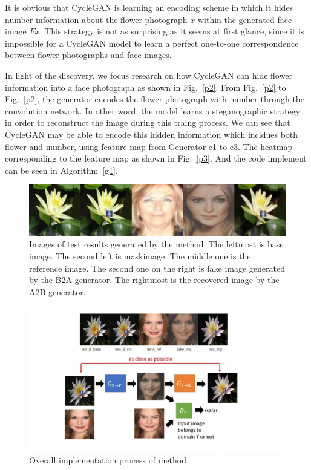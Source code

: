 \documentclass[a4paper]{article}
\begin{document}
	It is obvious that CycleGAN is learning an encoding scheme in which it hides number information about the flower photograph $x$ within the generated face image $F x$. This strategy is not as surprising as it seems at first glance, since it is impossible for a CycleGAN model to learn a perfect one-to-one correspondence between flower photographs and face images.
	
	In light of the discovery, we focus research on how CycleGAN can hide flower information into a face photograph as shown in Fig.~\ref{p2}. From Fig.~\ref{p2} to Fig.~\ref{p2}, the generator encodes the flower photograph with number through the convolution network. In other word, the model learns a steganographic strategy in order to reconstruct the image during this traing process. We can see that CycleGAN may be able to encode this hidden information which incldues both flower and number, using feature map from Generator c1 to c3. The heatmap corresponding to the feature map as shown in Fig.~\ref{p3}. And the code implement can be seen in Algorithm~\ref{g1}.
	\begin{figure}
		\begin{center}
			\includegraphics[scale=0.3]{figures/image_00284/BtoA_image_00284.jpg}
		\end{center}
		\caption{Images of test results generated by the method. The leftmost is base image. The second left is maskimage. The middle one is the reference image. The second one on the right is fake image generated by the B2A generator. The rightmost is the recovered image by the A2B generator.}
		\label{p1}
	\end{figure} 
	
		\begin{figure}
			\begin{center}
				\includegraphics[scale=0.3]{figures/encripgan.jpg}
			\end{center}
			\caption{Overall implementation process of method.}
			\label{p9}
		\end{figure} 
	
\end{document}
